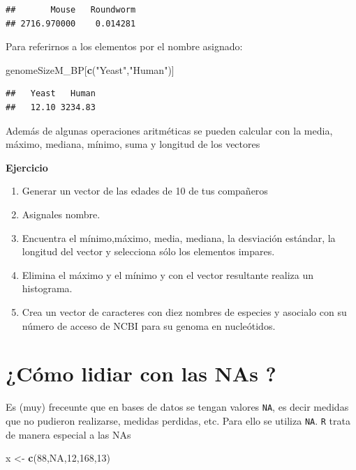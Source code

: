 \documentclass[
]{book}
\newenvironment{Shaded}{\begin{snugshade}}{\end{snugshade}}
\newcommand{\ConstantTok}[1]{\textcolor[rgb]{0.56,0.35,0.01}{#1}}
\newcommand{\DecValTok}[1]{\textcolor[rgb]{0.00,0.00,0.81}{#1}}
\newcommand{\FunctionTok}[1]{\textcolor[rgb]{0.13,0.29,0.53}{\textbf{#1}}}
\newcommand{\NormalTok}[1]{#1}
\newcommand{\OtherTok}[1]{\textcolor[rgb]{0.56,0.35,0.01}{#1}}
\newcommand{\StringTok}[1]{\textcolor[rgb]{0.31,0.60,0.02}{#1}}
\providecommand{\tightlist}{%
  \setlength{\itemsep}{0pt}\setlength{\parskip}{0pt}}
\begin{document}
\begin{verbatim}
##       Mouse   Roundworm 
## 2716.970000    0.014281
\end{verbatim}

Para referirnos a los elementos por el nombre asignado:

\begin{Shaded}
\begin{Highlighting}[]
\NormalTok{genomeSizeM\_BP[}\FunctionTok{c}\NormalTok{(}\StringTok{"Yeast"}\NormalTok{,}\StringTok{"Human"}\NormalTok{)]}
\end{Highlighting}
\end{Shaded}

\begin{verbatim}
##   Yeast   Human 
##   12.10 3234.83
\end{verbatim}

Además de algunas operaciones aritméticas se pueden calcular con la media, máximo, mediana, mínimo, suma y longitud de los vectores

\textbf{Ejercicio}

\begin{enumerate}
\def\labelenumi{\arabic{enumi}.}
\tightlist
\item
  Generar un vector de las edades de 10 de tus compañeros
\item
  Asignales nombre.
\item
  Encuentra el mínimo,máximo, media, mediana, la desviación estándar, la longitud del vector y selecciona sólo los elementos impares.
\item
  Elimina el máximo y el mínimo y con el vector resultante realiza un histograma.
\item
  Crea un vector de caracteres con diez nombres de especies y asocialo con su número de acceso de NCBI para su genoma en nucleótidos.
\end{enumerate}

\hypertarget{cuxf3mo-lidiar-con-las-nas}{%
\section{¿Cómo lidiar con las NAs ?}\label{cuxf3mo-lidiar-con-las-nas}}

Es (muy) freceunte que en bases de datos se tengan valores \texttt{NA}, es decir medidas que no pudieron realizarse, medidas perdidas, etc. Para ello se utiliza \texttt{NA}.
\texttt{R} trata de manera especial a las NAs

\begin{Shaded}
\begin{Highlighting}[]
\NormalTok{x }\OtherTok{\textless{}{-}} \FunctionTok{c}\NormalTok{(}\DecValTok{88}\NormalTok{,}\ConstantTok{NA}\NormalTok{,}\DecValTok{12}\NormalTok{,}\DecValTok{168}\NormalTok{,}\DecValTok{13}\NormalTok{)}
\end{Highlighting}
\end{Shaded}
\end{document}
